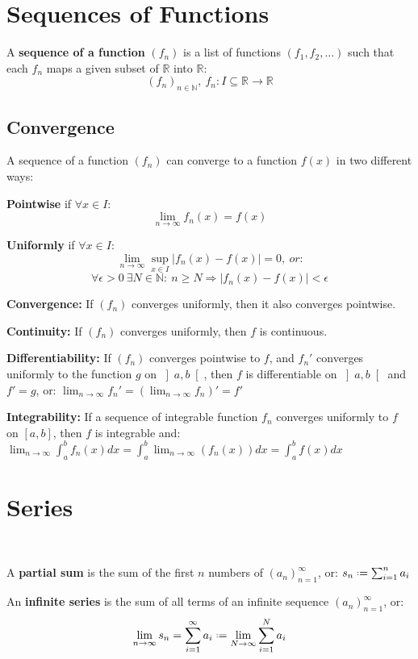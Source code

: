 \documentclass[8pt,a4paper]{extarticle}     %
\theoremstyle{definition}
\theoremstyle{definition}
\theoremstyle{definition}
\newcommand{\R}{\mathbb{R}}
\newcommand{\N}{\mathbb{N}}
\newcommand*{\defeq}{\mathrel{\vcenter{\baselineskip0.5ex \lineskiplimit0pt
            \hbox{\scriptsize.}\hbox{\scriptsize.}}}%
            =}
\begin{document}
\begin{multicols}{4}
\vfill\null
\columnbreak
\section{Sequences of Functions}
\begin{boxdefinition}
	A \textbf{sequence of a function} $(f_n)$ is a list of functions $(f_1,f_2,...)$ such that each $f_n$ maps a given subset of $\R$ into $\R$:
	$$(f_n)_{n\in\N},\ f_n:I\subseteq\R\longrightarrow\R$$
\end{boxdefinition}
\subsection{Convergence}
\begin{boxdefinition}
	A sequence of a function $(f_n)$ can converge to a function $f(x)$ in two different ways:
	\begin{bulletlist}
		\item \textbf{Pointwise} if $\forall x\in I $:
		$$\lim_{n\to\infty} f_n(x)=f(x)$$
		\item \textbf{Uniformly} if $\forall x\in I $:
		$$\lim_{n\to\infty}\sup_{x\in I} |f_n(x)-f(x)| = 0,\ \textit{or:}$$
		$$\forall \epsilon > 0 \ \exists N\in\N:\ n\geq N \Rightarrow |f_n(x)-f(x)| < \epsilon $$
	\end{bulletlist}
\end{boxdefinition}
\begin{eqlist}
	\item \textbf{Convergence:} If $(f_n)$ converges uniformly, then it also converges pointwise.
	\item \textbf{Continuity:} If $(f_n)$ converges uniformly, then $f$ is continuous.
	\item \textbf{Differentiability:} If $(f_n)$ converges pointwise to $f$, and $f_n'$ converges uniformly to the function $g$ on $\left]a,b\right[$, then $f$ is differentiable on $\left]a,b\right[$ and $f'=g$, or: 	$\lim_{n\to\infty}f_n'=\left(\lim_{n\to\infty}f_n\right)'=f'$
	\item \textbf{Integrability:} If a sequence of integrable function $f_n$ converges uniformly to $f$ on $[a,b]$, then $f$ is integrable and: \\
	$\lim_{n\to\infty}\int_a^b f_n(x)dx = \int_a^b \lim_{n\to\infty}\left(f_n(x)\right)dx = \int_a^b f(x)dx$
\end{eqlist}
\vfill\eject
\columnbreak

\section{Series}
\begin{boxdefinition}\
	\begin{bulletlist}
		\item A \textbf{partial sum} is the sum of the first $n$ numbers of $(a_n)_{n=1}^\infty$, or:
		$s_n \defeq \sum_{i=1}^n a_i$
		\item An \textbf{infinite series} is the sum of all terms of an infinite sequence $(a_n)_{n=1}^\infty$, or:
		$$\lim_{n\to\infty}s_n = \sum_{i=1}^\infty a_i \defeq \lim_{N\to\infty}\sum_{i=1}^N a_i$$
	\end{bulletlist}
\end{boxdefinition}

\end{multicols}
\end{document}
